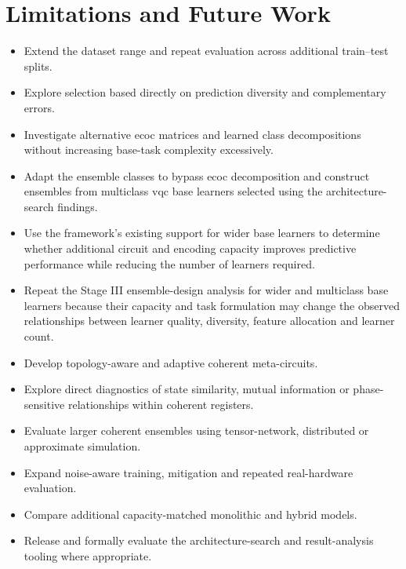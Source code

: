 \documentclass[]{UCD_CS_MSc_AAI_Report}
\begin{document}
\section{Limitations and Future Work}
\label{sec:conclusion-future}
\begin{itemize}
    \item Extend the dataset range and repeat evaluation across additional train--test splits.
    \item Explore selection based directly on prediction diversity and complementary errors.
    \item Investigate alternative \ac{ecoc} matrices and learned class decompositions without increasing base-task complexity excessively.
    \item Adapt the ensemble classes to bypass \ac{ecoc} decomposition and construct ensembles from multiclass \ac{vqc} base learners selected using the architecture-search findings.
    \item Use the framework's existing support for wider base learners to determine whether additional circuit and encoding capacity improves predictive performance while reducing the number of learners required.
    \item Repeat the Stage III ensemble-design analysis for wider and multiclass base learners because their capacity and task formulation may change the observed relationships between learner quality, diversity, feature allocation and learner count.
    \item Develop topology-aware and adaptive coherent meta-circuits.
    \item Explore direct diagnostics of state similarity, mutual information or phase-sensitive relationships within coherent registers.
    \item Evaluate larger coherent ensembles using tensor-network, distributed or approximate simulation.
    \item Expand noise-aware training, mitigation and repeated real-hardware evaluation.
    \item Compare additional capacity-matched monolithic and hybrid models.
    \item Release and formally evaluate the architecture-search and result-analysis tooling where appropriate.
\end{itemize}
\end{document}
